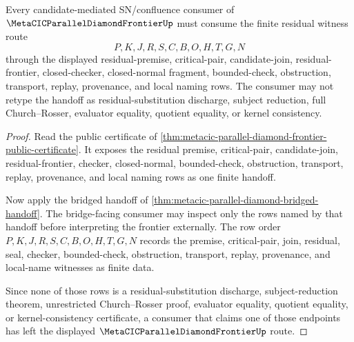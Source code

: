 \begin{theorem}
\label{thm:metacic-parallel-diamond-finite-residual-witness-consumption}
Every candidate-mediated SN/confluence consumer of $\MetaCICParallelDiamondFrontierUp$ must consume the finite residual witness route
$$
P,K,J,R,S,C,B,O,H,T,G,N
$$
through the displayed residual-premise, critical-pair, candidate-join, residual-frontier, closed-checker, closed-normal fragment, bounded-check, obstruction, transport, replay, provenance, and local naming rows. The consumer may not retype the handoff as residual-substitution discharge, subject reduction, full Church--Rosser, evaluator equality, quotient equality, or kernel consistency.
\end{theorem}
\begin{proof}
Read the public certificate of \autoref{thm:metacic-parallel-diamond-frontier-public-certificate}. It exposes the residual premise, critical-pair, candidate-join, residual-frontier, checker, closed-normal, bounded-check, obstruction, transport, replay, provenance, and local naming rows as one finite handoff.

Now apply the bridged handoff of \autoref{thm:metacic-parallel-diamond-bridged-handoff}. The bridge-facing consumer may inspect only the rows named by that handoff before interpreting the frontier externally. The row order $P,K,J,R,S,C,B,O,H,T,G,N$ records the premise, critical-pair, join, residual, seal, checker, bounded-check, obstruction, transport, replay, provenance, and local-name witnesses as finite data.

Since none of those rows is a residual-substitution discharge, subject-reduction theorem, unrestricted Church--Rosser proof, evaluator equality, quotient equality, or kernel-consistency certificate, a consumer that claims one of those endpoints has left the displayed $\MetaCICParallelDiamondFrontierUp$ route.
\end{proof}

